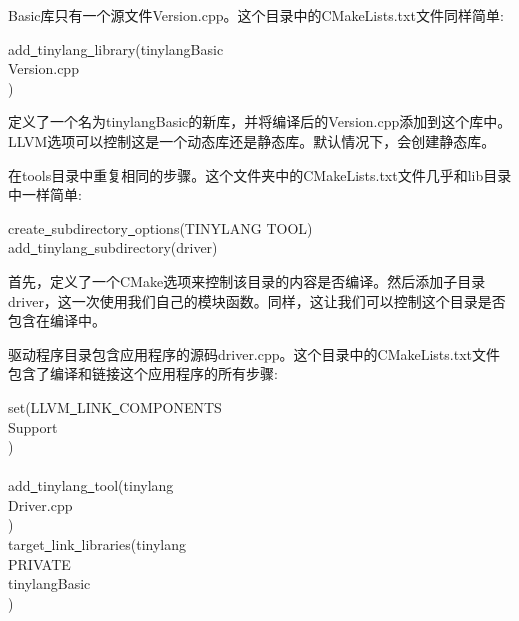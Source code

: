 Basic库只有一个源文件Version.cpp。这个目录中的CMakeLists.txt文件同样简单:\par

\begin{tcolorbox}[colback=white,colframe=black]
add\underline{~}tinylang\underline{~}library(tinylangBasic \\
\hspace*{0.5cm}Version.cpp \\
)
\end{tcolorbox}

定义了一个名为tinylangBasic的新库，并将编译后的Version.cpp添加到这个库中。LLVM选项可以控制这是一个动态库还是静态库。默认情况下，会创建静态库。\par

在tools目录中重复相同的步骤。这个文件夹中的CMakeLists.txt文件几乎和lib目录中一样简单:\par

\begin{tcolorbox}[colback=white,colframe=black]
create\underline{~}subdirectory\underline{~}options(TINYLANG TOOL) \\
add\underline{~}tinylang\underline{~}subdirectory(driver)
\end{tcolorbox}

首先，定义了一个CMake选项来控制该目录的内容是否编译。然后添加子目录driver，这一次使用我们自己的模块函数。同样，这让我们可以控制这个目录是否包含在编译中。\par

驱动程序目录包含应用程序的源码driver.cpp。这个目录中的CMakeLists.txt文件包含了编译和链接这个应用程序的所有步骤:\par

\begin{tcolorbox}[colback=white,colframe=black]
set(LLVM\underline{~}LINK\underline{~}COMPONENTS\\
\hspace*{0.5cm}Support\\
)\\
\\
add\underline{~}tinylang\underline{~}tool(tinylang\\
\hspace*{0.5cm}Driver.cpp\\
) \\

target\underline{~}link\underline{~}libraries(tinylang \\
\hspace*{0.5cm}PRIVATE\\
\hspace*{0.5cm}tinylangBasic\\
)
\end{tcolorbox}

